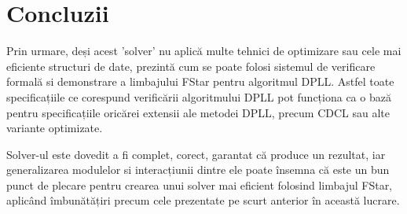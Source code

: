 \chapter*{Concluzii} 


Prin urmare, deși acest 'solver' nu aplică multe tehnici de optimizare sau cele mai eficiente structuri de date, prezintă cum se poate folosi sistemul de verificare formală si demonstrare a limbajului FStar pentru algoritmul DPLL. Astfel toate specificațiile ce corespund verificării algoritmului DPLL pot funcționa ca o bază pentru specificațiile oricărei extensii ale metodei DPLL, precum CDCL sau alte variante optimizate.

Solver-ul este dovedit a fi complet, corect, garantat că produce un rezultat, iar generalizarea modulelor si interacțiunii dintre ele poate însemna că este un bun punct de plecare pentru crearea unui solver mai eficient folosind limbajul FStar, aplicând \linebreak îmbunătățiri precum cele prezentate pe scurt anterior în această lucrare. 

